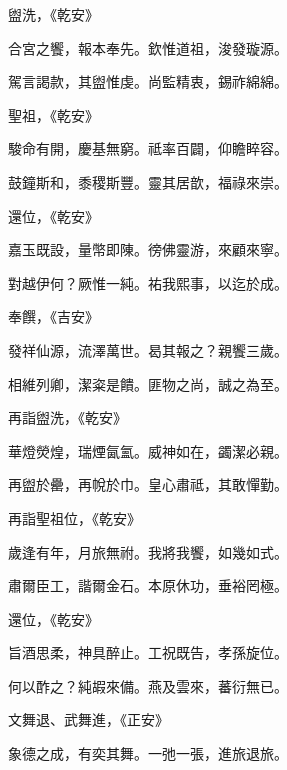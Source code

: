 \begin{pinyinscope}
 盥洗，《乾安》



 合宮之饗，報本奉先。欽惟道祖，浚發璇源。



 駕言謁款，其盥惟虔。尚監精衷，錫祚綿綿。



 聖祖，《乾安》



 駿命有開，慶基無窮。祗率百闢，仰瞻睟容。



 鼓鐘斯和，黍稷斯豐。靈其居歆，福祿來崇。



 還位，《乾安》



 嘉玉既設，量幣即陳。徬佛靈游，來顧來寧。



 對越伊何？厥惟一純。祐我熙事，以迄於成。



 奉饌，《吉安》



 發祥仙源，流澤萬世。曷其報之？親饗三歲。



 相維列卿，潔粢是饋。匪物之尚，誠之為至。



 再詣盥洗，《乾安》



 華燈熒煌，瑞煙氤氳。威神如在，蠲潔必親。



 再盥於罍，再帨於巾。皇心肅祗，其敢憚勤。



 再詣聖祖位，《乾安》



 歲逢有年，月旅無祔。我將我饗，如幾如式。



 肅爾臣工，諧爾金石。本原休功，垂裕罔極。



 還位，《乾安》



 旨酒思柔，神具醉止。工祝既告，孝孫旋位。



 何以酢之？純嘏來備。燕及雲來，蕃衍無已。



 文舞退、武舞進，《正安》



 象德之成，有奕其舞。一弛一張，進旅退旅。




\end{pinyinscope}
